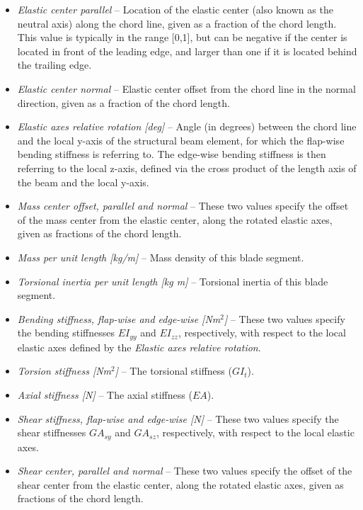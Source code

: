 \begin{itemize}
\item{\sl Elastic center parallel} --
  Location of the elastic center (also known as the neutral axis)
  along the chord line, given as a fraction of the chord length.
  This value is typically in the range [0,1], but can be negative if the center
  is located in front of the leading edge, and larger than one if it is located
  behind the trailing edge.
\item{\sl Elastic center normal} --
  Elastic center offset from the chord line in the normal direction,
  given as a fraction of the chord length.
\item{\sl Elastic axes relative rotation [deg]} --
  Angle (in degrees) between the chord line and the local y-axis of the
  structural beam element, for which the flap-wise bending stiffness is
  referring to. The edge-wise bending stiffness is then referring to the
  local z-axis, defined via the cross product of the length axis of the
  beam and the local y-axis.
\item{\sl Mass center offset, parallel and normal} --
  These two values specify the offset of the mass center from the
  elastic center, along the rotated elastic axes,
  given as fractions of the chord length.
\item{\sl Mass per unit length [kg/m]} --
  Mass density of this blade segment.
\item{\sl Torsional inertia per unit length [kg m]} --
  Torsional inertia of this blade segment.
\item{\sl Bending stiffness, flap-wise and edge-wise [Nm$^2$]} --
  These two values specify the bending stiffnesses $EI_{yy}$ and $EI_{zz}$,
  respectively, with respect to the local elastic axes defined by the
  {\sl Elastic axes relative rotation}.
\item{\sl Torsion stiffness [Nm$^2$]} --
  The torsional stiffness ($GI_t$).
\item{\sl Axial stiffness [N]} --
  The axial stiffness ($EA$).
\item{\sl Shear stiffness, flap-wise and edge-wise [N]} --
  These two values specify the shear stiffnesses $GA_{sy}$ and $GA_{sz}$,
  respectively, with respect to the local elastic axes.
\item{\sl Shear center, parallel and normal} --
  These two values specify the offset of the shear center from the
  elastic center, along the rotated elastic axes,
  given as fractions of the chord length.
\end{itemize}


